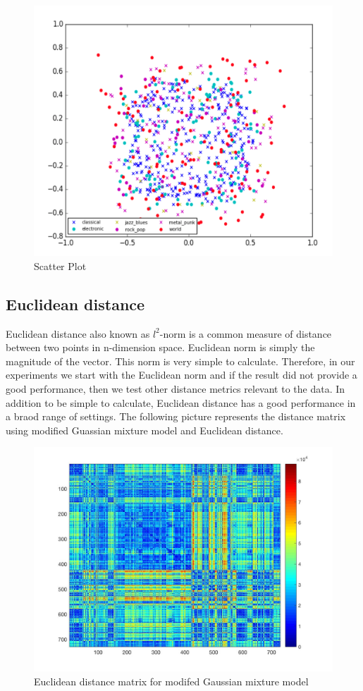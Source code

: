 \documentclass[12pt]{article}
\begin{document}
\begin{figure}[H]\label{emd_scatter}
\center
\includegraphics[scale=0.8]{emd_scatter.png}
\caption{Scatter Plot}
\end{figure}

\subsection{Euclidean distance}
Euclidean distance also known as $l^2$-norm is a common measure of distance between two points in n-dimension space. Euclidean norm is simply the magnitude of the vector. This norm is very simple to calculate. Therefore, in our experiments we start with the Euclidean norm and if the result did not provide a good performance, then we test other distance metrics relevant to the data. In addition to be simple to calculate, Euclidean distance has a good performance in a braod range of settings. The following picture represents the distance matrix using modified Guassian mixture model and Euclidean distance. 
\begin{figure}[H]\label{distMat30}
	\centering
	\includegraphics[width=1\linewidth]{distMat30.jpg}
	\caption{Euclidean distance matrix for modifed Gaussian mixture model}
\end{figure}
\end{document}

